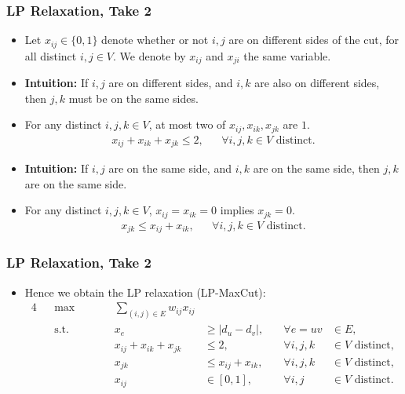\documentclass{beamer}
\begin{document}
    \begin{frame}
        \frametitle{LP Relaxation, Take 2}
    
        \begin{itemize}
            \item Let $x_{ij} \in \{ 0, 1 \}$ denote whether or not $i, j$ are on different sides of the cut, for all distinct $i, j \in V$. We denote by $x_{ij}$ and $x_{ji}$ the same variable. \pause
            \item {\bf Intuition:} If $i, j$ are on different sides, and $i, k$ are also on different sides, then $j, k$ must be on the same sides. \pause
            \item For any distinct $i, j, k \in V$, at most two of $x_{ij}, x_{ik}, x_{jk}$ are $1$. \pause
            \begin{align*}
                x_{ij} + x_{ik} + x_{jk} \leq 2, && \forall i, j, k \in V \text{ distinct}.
            \end{align*}
            \pause
            \vspace{-1em}
            \item {\bf Intuition:} If $i, j$ are on the same side, and $i, k$ are on the same side, then $j, k$ are on the same side. \pause
            \item For any distinct $i, j, k \in V$, $x_{ij} = x_{ik} = 0$ implies $x_{jk} = 0$. \pause
            \begin{align*}
                x_{jk} \leq x_{ij} + x_{ik}, && \forall i, j, k \in V \text{ distinct}.
            \end{align*}
        \end{itemize}
    \end{frame}

    \begin{frame}
        \frametitle{LP Relaxation, Take 2}
    
        \begin{itemize}
            \item Hence we obtain the LP relaxation {\sc (LP-MaxCut)}:
            \begin{alignat*}{4}
                && \max \qquad && \sum_{(i, j) \in E} w_{ij} x_{ij} \\
                && \text{s.t.} \qquad && x_e & \geq \left|d_u - d_v\right|, & \quad \forall e = uv & \in E, \\
                && && x_{ij} + x_{ik} + x_{jk} & \leq 2, & \quad \forall i, j, k & \in V \text{ distinct}, \\
                && && x_{jk} & \leq x_{ij} + x_{ik}, & \quad \forall i, j, k & \in V \text{ distinct}, \\
                && && x_{ij} & \in [0, 1], & \quad \forall i, j & \in V \text{ distinct}.
              \end{alignat*}
        \end{itemize}
    \end{frame}
\end{document}
